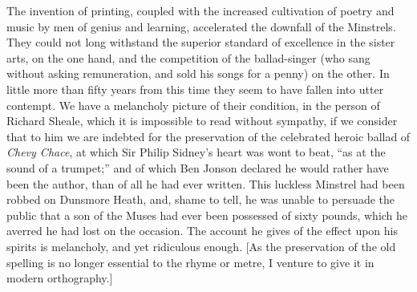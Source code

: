 The invention of printing, coupled with the increased cultivation of poetry and
music by men of genius and learning, accelerated the downfall of the Minstrels.
They could not long withstand the superior standard of excellence in the sister
arts, on the one hand, and the competition of the ballad-singer (who sang without
asking remuneration, and sold his songs for a penny) on the other. In little more
than fifty years from this time they seem to have fallen into utter contempt. We
have a melancholy picture of their condition, in the person of Richard Sheale,
which it is impossible to read without sympathy, if we consider that to him we
are indebted for the preservation of the celebrated heroic ballad of \textit{Chevy Chace},\pagebreak
at which Sir Philip Sidney’s heart was 
 wont to beat, “as at the sound of a  
trumpet;” %
and of which Ben Jonson declared he would rather have been the 
author, than of all he had ever written. This luckless Minstrel had been robbed
on Dunsmore Heath, and, shame to tell, he was unable to persuade the public
that a son of the Muses had ever been possessed of sixty pounds, which he
averred he had lost on the occasion. The account he gives of the effect upon his
spirits is melancholy, and yet ridiculous enough. [As the preservation of the
old spelling is no longer essential to the rhyme or metre, I venture to give it in
modern orthography.]

